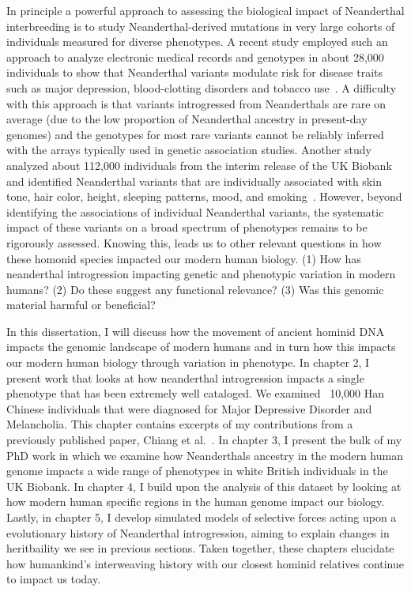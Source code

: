 In principle a powerful approach to assessing the biological impact of Neanderthal interbreeding is to study Neanderthal-derived mutations in very large cohorts of individuals measured for diverse phenotypes. A recent study employed such an approach to analyze electronic medical records and genotypes in about 28,000 individuals to show that Neanderthal variants modulate risk for disease traits such as major depression, blood-clotting disorders and tobacco use~\cite{simonti2016phenotypic}. A difficulty with this approach is that variants introgressed from Neanderthals are rare on average (due to the low proportion of Neanderthal ancestry in present-day genomes) and the genotypes for most rare variants cannot be reliably inferred with the arrays typically used in genetic association studies. Another study analyzed about 112,000 individuals from the interim release of the UK Biobank and identified Neanderthal variants that are individually associated with skin tone, hair color, height, sleeping patterns, mood, and smoking~\cite{dannemann2017contribution}. However, beyond identifying the associations of individual Neanderthal variants, the systematic impact of these variants on a broad spectrum of phenotypes remains to be rigorously assessed. Knowing this, leads us to other relevant questions in how these homonid species impacted our modern human biology. (1) How has neanderthal introgression impacting genetic and phenotypic variation in modern humans? (2) Do these suggest any functional relevance? (3) Was this genomic material harmful or beneficial? 

In this dissertation, I will discuss how the movement of ancient hominid DNA impacts the genomic landscape of modern humans and in turn how this impacts our modern human biology through variation in phenotype. In chapter 2, I present work that looks at how neanderthal introgression impacts a single phenotype that has been extremely well cataloged. We examined ~10,000 Han Chinese individuals that were diagnosed for Major Depressive Disorder and Melancholia. This chapter contains excerpts of my contributions from a previously published paper, Chiang et al.~\cite{chiang2018comprehensive}. In chapter 3, I present the bulk of my PhD work in which we examine how Neanderthals ancestry in the modern human genome impacts a wide range of phenotypes in white British individuals in the UK Biobank. In chapter 4, I build upon the analysis of this dataset by looking at how modern human specific regions in the human genome impact our biology. Lastly, in chapter 5, I develop simulated models of selective forces acting upon a evolutionary history of Neanderthal introgression, aiming to explain changes in heritbaility we see in previous sections. Taken together, these chapters elucidate how humankind's interweaving history with our closest hominid relatives continue to impact us today.




